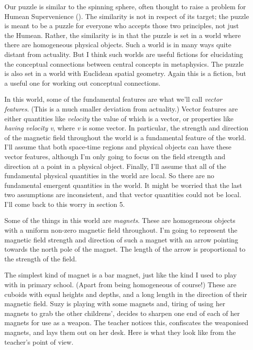 \documentclass[
  10pt,
  letterpaper,
  DIV=11,
  numbers=noendperiod,
  twoside]{scrartcl}
\begin{document}
Our puzzle is similar to the spinning sphere, often thought to raise a
problem for Humean Supervenience (). The similarity is not in respect of its target; the puzzle is
meant to be a puzzle for everyone who accepts those two principles, not
just the Humean. Rather, the similarity is in that the puzzle is set in
a world where there are homogeneous physical objects. Such a world is in
many ways quite distant from actuality. But I think such worlds are
useful fictions for elucidating the conceptual connections between
central concepts in metaphysics. The puzzle is also set in a world with
Euclidean spatial geometry. Again this is a fiction, but a useful one
for working out conceptual connections.

In this world, some of the fundamental features are what we'll call
\emph{vector features}. (This is a much smaller deviation from
actuality.) Vector features are either quantities like \emph{velocity}
the value of which is a vector, or properties like \emph{having
velocity} \emph{v}, where \emph{v} is some vector. In particular, the
strength and direction of the magnetic field throughout the world is a
fundamental feature of the world. I'll assume that both space-time
regions and physical objects can have these vector features, although
I'm only going to focus on the field strength and direction at a point
in a physical object. Finally, I'll assume that all of the fundamental
physical quantities in the world are local. So there are no fundamental
emergent quantities in the world. It might be worried that the last two
assumptions are inconsistent, and that vector quantities could not be
local. I'll come back to this worry in section 5.

Some of the things in this world are \emph{magnets}. These are
homogeneous objects with a uniform non-zero magnetic field throughout.
I'm going to represent the magnetic field strength and direction of such
a magnet with an arrow pointing towards the north pole of the magnet.
The length of the arrow is proportional to the strength of the field.

The simplest kind of magnet is a bar magnet, just like the kind I used
to play with in primary school. (Apart from being homogeneous of
course!) These are cuboids with equal heights and depths, and a long
length in the direction of their magnetic field. Suzy is playing with
some magnets and, tiring of using her magnets to grab the other
childrens', decides to sharpen one end of each of her magnets for use as
a weapon. The teacher notices this, confiscates the weaponised magnets,
and lays them out on her desk. Here is what they look like from the
teacher's point of view.
\end{document}
